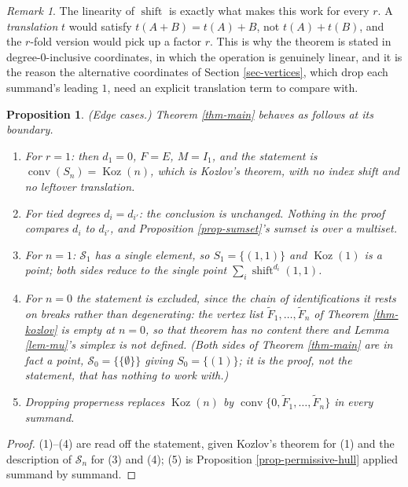 \documentclass[11pt, a4paper, abstract=yes]{scrartcl}
\theoremstyle{definition}
\theoremstyle{remark}
\newtheorem{remark}[definition]{Remark}
\theoremstyle{plain}
\newtheorem{proposition}[definition]{Proposition}
\newcommand{\Koz}{\operatorname{Koz}}
\newcommand{\shift}{\operatorname{shift}}
\newcommand{\conv}{\operatorname{conv}}
\begin{document}
\begin{remark}
The linearity of \(\shift\) is exactly what makes this work for every \(r\). A \emph{translation} \(t\)
would satisfy \(t(A+B)=t(A)+B\), not \(t(A)+t(B)\), and the \(r\)-fold version would pick up a factor
\(r\). This is why the theorem is stated in degree-\(0\)-inclusive coordinates, in which the
operation is genuinely linear, and it is the reason the alternative coordinates of
Section \ref{sec-vertices}, which drop each summand's leading \(1\), need an explicit translation
term to compare with.
\label{rem-linearity}
\end{remark}

\begin{proposition}
(\emph{Edge cases.}) Theorem \ref{thm-main} behaves as follows at its boundary.
\begin{enumerate}
\item For \(r=1\): then \(d_1=0\), \(F=E\), \(M=I_1\), and the statement is
\(\conv(S_n)=\Koz(n)\), which is Kozlov's theorem, with no index shift and no leftover
translation.
\item For tied degrees \(d_i=d_{i'}\): the conclusion is unchanged. Nothing in the proof compares
\(d_i\) to \(d_{i'}\), and Proposition \ref{prop-sumset}'s sumset is over a multiset.
\item For \(n=1\): \(\mathcal S_1\) has a single element, so \(S_1=\lbrace(1,1)\rbrace\) and
\(\Koz(1)\) is a point; both sides reduce to the single point \(\sum_i\shift^{d_i}(1,1)\).
\item For \(n=0\) the statement is excluded, since the chain of identifications it rests on breaks
rather than degenerating: the vertex list \(\tilde F_1,\dots,\tilde F_n\) of
Theorem \ref{thm-kozlov} is empty at \(n=0\), so that theorem has no content there and
Lemma \ref{lem-mu}'s simplex is not defined. (Both sides of Theorem \ref{thm-main} are in fact a
point, \(\mathcal S_0=\lbrace\lbrace\emptyset\rbrace\rbrace\) giving \(S_0=\lbrace(1)\rbrace\); it
is the proof, not the statement, that has nothing to work with.)
\item Dropping properness replaces \(\Koz(n)\) by
\(\conv\lbrace0,\tilde F_1,\dots,\tilde F_n\rbrace\) in every summand.
\end{enumerate}
\label{prop:edge-cases}
\label{prop-edge-cases}
\end{proposition}

\begin{proof}
(1)--(4) are read off the statement, given Kozlov's theorem for (1) and the description of
\(\mathcal S_n\) for (3) and (4); (5) is Proposition \ref{prop-permissive-hull} applied summand by summand.
\end{proof}
\end{document}
